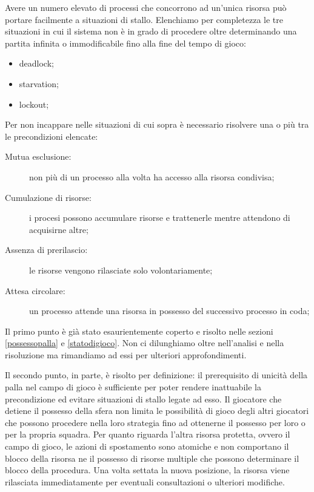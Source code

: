 \documentclass[aps,letterpaper,10pt]{article}
\begin{document}
Avere un numero elevato di processi che concorrono ad un'unica risorsa pu\`o portare facilmente a situazioni di stallo.
Elenchiamo per completezza le tre situazioni in cui il sistema non \`e in grado di procedere oltre determinando una
partita infinita o immodificabile fino alla fine del tempo di gioco:

\begin{itemize}
	\item deadlock;
	\item starvation;
	\item lockout;
\end{itemize}

Per non incappare nelle situazioni di cui sopra \`e necessario risolvere una o pi\`u tra le precondizioni elencate:

\begin{description}
	\item[Mutua esclusione:] non pi\`u di un processo alla volta ha accesso alla risorsa condivisa;
\item[Cumulazione di risorse:] i procesi possono accumulare risorse e trattenerle mentre attendono di acquisirne altre;	\item[Assenza di prerilascio:] le risorse vengono rilasciate solo volontariamente;
	\item[Attesa circolare:] un processo attende una risorsa in possesso del successivo processo in coda;
\end{description}

Il primo punto \`e gi\`a stato esaurientemente coperto e risolto nelle sezioni \ref{possessopalla} e \ref{statodigioco}.
Non ci dilunghiamo oltre nell'analisi e nella risoluzione ma rimandiamo ad essi per ulteriori approfondimenti.
\vspace{3mm}

Il secondo punto, in parte, \`e risolto per definizione: il prerequisito di unicit\`a della palla nel campo di gioco \`e
sufficiente per poter rendere inattuabile la precondizione ed evitare situazioni di stallo legate ad esso. Il giocatore
che detiene il possesso della sfera non limita le possibilit\`a di gioco degli altri giocatori che possono procedere
nella loro strategia fino ad ottenerne il possesso per loro o per la propria squadra. Per quanto riguarda l'altra
risorsa protetta, ovvero il campo di gioco, le azioni di spostamento sono atomiche e non comportano il blocco della
risorsa ne il possesso di risorse multiple che possono determinare il blocco della procedura. Una volta settata la nuova
posizione, la risorsa viene rilasciata immediatamente per eventuali consultazioni o ulteriori modifiche. \vspace{3mm}
\end{document}
